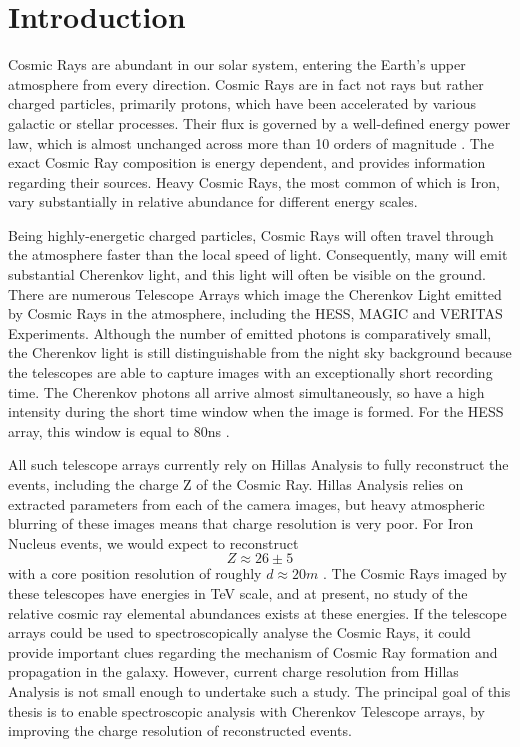 \documentclass[11pt]{article}
\begin{document}
\section{Introduction}
Cosmic Rays are abundant in our solar system, entering the Earth's upper atmosphere from every direction. Cosmic Rays are in fact not rays but rather charged particles, primarily protons, which have been accelerated by various galactic or stellar processes. Their flux is governed by a well-defined energy power law, which is almost unchanged across more than 10 orders of magnitude \cite{Blasi:2013rva}.  The exact Cosmic Ray composition is energy dependent, and provides information regarding their sources. Heavy Cosmic Rays, the most common of which is Iron, vary substantially in relative abundance for different energy scales.

Being highly-energetic charged particles, Cosmic Rays will often travel through the atmosphere faster than the local speed of light. Consequently, many will emit substantial Cherenkov light, and this light will often be visible on the ground. There are numerous Telescope Arrays which image the Cherenkov Light emitted by Cosmic Rays in the atmosphere, including the HESS, MAGIC and VERITAS Experiments. Although the number of emitted photons is comparatively small, the Cherenkov light is still distinguishable from the night sky background because the telescopes are able to capture images with an exceptionally short recording time. The Cherenkov photons all arrive almost simultaneously, so have a high intensity during the short time window when the image is formed. For the HESS array, this window is equal to 80ns \cite{Funk:2004ie}.

All such telescope arrays currently rely on Hillas Analysis to fully reconstruct the events, including the  charge Z of the Cosmic Ray. Hillas Analysis relies on extracted parameters from each of the camera images, but heavy atmospheric blurring of these images means that charge resolution is very poor. For Iron Nucleus events, we would expect to reconstruct \[Z \approx 26 \pm 5 \] with a core position resolution of roughly $d \approx 20 m $ \cite{hess07}. The Cosmic Rays imaged by these telescopes have energies in TeV scale, and at present, no study of the relative cosmic ray elemental abundances exists at these energies. If the telescope arrays could be used to spectroscopically analyse the Cosmic Rays, it could provide important clues regarding the mechanism of Cosmic Ray formation and propagation in the galaxy. However, current charge resolution from Hillas Analysis is not small enough to undertake such a study. The principal goal of this thesis is to enable spectroscopic analysis with Cherenkov Telescope arrays, by improving the charge resolution of reconstructed events.
\end{document}
